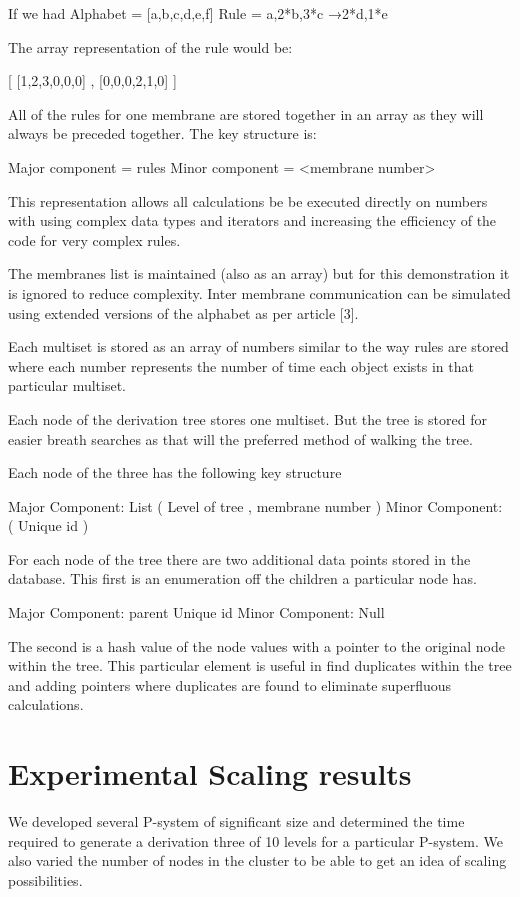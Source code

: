 \documentclass[runningheads]{llncs}
\begin{document}
If we had
Alphabet = [a,b,c,d,e,f]
Rule = a,2*b,3*c →2*d,1*e 

The array representation of the rule would be:

[ [1,2,3,0,0,0] , [0,0,0,2,1,0] ]

All of the rules for one membrane are stored together in an array as they will always be preceded together. The key structure is:

Major component = rules
Minor component = <membrane number>

This representation allows all calculations be be executed directly on numbers with using complex data  types and iterators and increasing the efficiency of the code for very complex rules.

The membranes list is maintained (also as an array) but for this demonstration it is ignored to reduce complexity. Inter membrane communication can be simulated using extended versions of the alphabet as per article [3].   

Each multiset is stored as an array of numbers similar to the way rules are stored where each number represents the number of time each object exists in that particular multiset. 

Each node of the derivation tree stores one multiset. But the tree is stored for easier breath searches as that will the preferred method of walking the tree.

Each node of the three has the following key structure

Major Component: List ( Level of tree ,  membrane number )
Minor Component:  ( Unique id )

For each node of the tree there are two additional data points stored in the database. This first is an enumeration off the children a particular node has. 

Major Component: parent Unique id 
Minor Component: Null

The second is a hash value of the node values with a pointer to the original node within the tree. This particular element is useful in find duplicates within the tree and adding pointers where duplicates are found to eliminate superfluous calculations.

\section{Experimental Scaling results}

We developed several P-system of significant size and determined the time required to generate a derivation three of 10 levels for a particular P-system. We also varied the number of nodes in the cluster to be able to get an idea of scaling possibilities.
\end{document}
